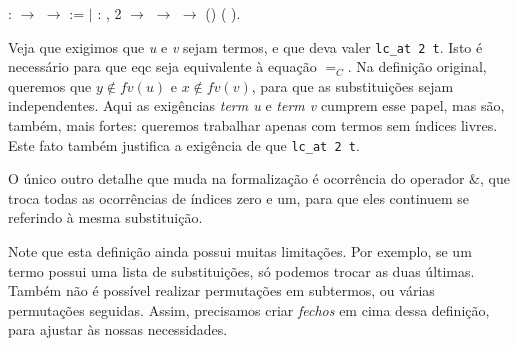 \bigskip
\coqdocnoindent
{}  :
 \ensuremath{\rightarrow} 
\ensuremath{\rightarrow}  := \coqdoceol \coqdocindent{1.00em}
\ensuremath{|} :
\coqdockw{\ensuremath{\forall}}   ,
 2  \ensuremath{\rightarrow}
  \ensuremath{\rightarrow}
  \ensuremath{\rightarrow}
(\coqdocnotation{[}\coqdocnotation{][}\coqdocnotation{]})
(\coqdocnotation{(}\coqdocnotation{\&}
\coqdocnotation{)[}\coqdocnotation{][}\coqdocnotation{]}).\coqdoceol
\bigskip


Veja que exigimos que \emph{u} e \emph{v} sejam termos, e que deva valer
\texttt{lc\_at 2 t}. Isto é necessário para que eqc seja equivalente à equação
$=_C$. Na definição original, queremos que $y \notin fv(u)$ e $x \notin fv(v)$,
para que as substituições sejam independentes. Aqui as exigências \emph{term u}
e \emph{term v} cumprem esse papel, mas são, também, mais fortes: queremos
trabalhar apenas com termos sem índices livres. Este fato também justifica a
exigência de que \texttt{lc\_at 2 t}.

O único outro detalhe que muda na formalização é ocorrência do operador $\&$,
que troca todas as ocorrências de índices zero e um, para que eles continuem se
referindo à mesma substituição.

Note que esta definição ainda possui muitas limitações. Por exemplo, se um termo
possui uma lista de substituições, só podemos trocar as duas últimas. Também não
é possível realizar permutações em subtermos, ou várias permutações seguidas.
Assim, precisamos criar \emph{fechos} em cima dessa definição, para ajustar às
nossas necessidades. 

